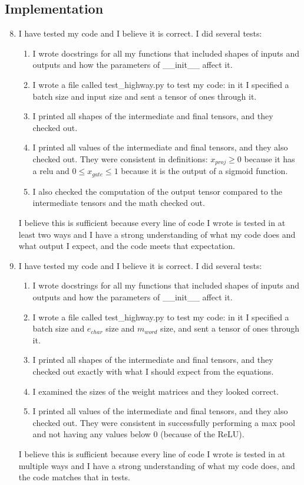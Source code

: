 \documentclass[12pt]{article}
\begin{document}
	\subsection*{Implementation}
	\begin{enumerate}[label=\alph*{.}]
	
  	\setcounter{enumi}{7}
	\item I have tested my code and I believe it is correct. I did several tests:
	\begin{enumerate}
	\item
		I wrote docstrings for all my functions that included shapes of inputs and outputs and how the parameters of \_\_init\_\_ affect it. 
	\item
		I wrote a file called test\_highway.py to test my code: in it I specified a batch size and input size and sent a tensor of ones through it.
	\item
		I printed all shapes of the intermediate and final tensors, and they checked out.
	\item
		I printed all values of the intermediate and final tensors, and they also checked out. They were consistent in definitions: $x_{proj} \geq 0$ because it has a relu and $0 \leq x_{gate} \leq 1$ because it is the output of a sigmoid function. 
	\item
		I also checked the computation of the output tensor compared to the intermediate tensors and the math checked out. 
	\end{enumerate}
	I believe this is sufficient because every line of code I wrote is tested in at least two ways and I have a strong understanding of what my code does and what output I expect, and the code meets that expectation.
	
	
	\item 
	I have tested my code and I believe it is correct. I did several tests:
	\begin{enumerate}
	\item
		I wrote docstrings for all my functions that included shapes of inputs and outputs and how the parameters of \_\_init\_\_ affect it. 
	\item
		I wrote a file called test\_highway.py to test my code: in it I specified a batch size and $e_{char}$ size and $m_{word}$ size, and sent a tensor of ones through it.
	\item
		I printed all shapes of the intermediate and final tensors, and they checked out exactly with what I should expect from the equations.
	\item
		I examined the sizes of the weight matrices and they looked correct.
	\item
		I printed all values of the intermediate and final tensors, and they also checked out. They were consistent in successfully performing a max pool and not having any values below 0 (because of the ReLU).
	\end{enumerate}
	I believe this is sufficient because every line of code I wrote is tested in at multiple ways and I have a strong understanding of what my code does, and the code matches that in tests.
	\end{enumerate}
\end{document}
